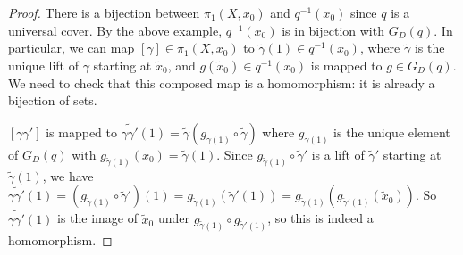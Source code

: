 \begin{proof}
	There is a bijection between \( \pi_1(X, x_0) \) and \( q^{-1}(x_0) \) since \( q \) is a universal cover.
	By the above example, \( q^{-1}(x_0) \) is in bijection with \( G_D(q) \).
	In particular, we can map \( [\gamma] \in \pi_1(X,x_0) \) to \( \widetilde \gamma(1) \in q^{-1}(x_0) \), where \( \widetilde \gamma \) is the unique lift of \( \gamma \) starting at \( \widetilde x_0 \), and \( g(\widetilde x_0) \in q^{-1}(x_0) \) is mapped to \( g \in G_D(q) \).
	We need to check that this composed map is a homomorphism: it is already a bijection of sets.

	\( [\gamma\gamma'] \) is mapped to \( \widetilde{\gamma\gamma'}(1) = \widetilde \gamma (g_{\widetilde \gamma(1)} \circ \widetilde \gamma) \) where \( g_{\widetilde\gamma(1)} \) is the unique element of \( G_D(q) \) with \( g_{\widetilde\gamma(1)}(x_0) = \widetilde \gamma(1) \).
	Since \( g_{\widetilde\gamma(1)} \circ \widetilde\gamma' \) is a lift of \( \widetilde \gamma' \) starting at \( \widetilde \gamma(1) \), we have \( \widetilde{\gamma\gamma'}(1) = (g_{\widetilde\gamma(1)} \circ \widetilde\gamma')(1) = g_{\widetilde\gamma(1)}(\widetilde\gamma'(1)) = g_{\widetilde\gamma(1)}(g_{\widetilde\gamma'(1)}(\widetilde x_0)) \).
	So \( \widetilde{\gamma\gamma'}(1) \) is the image of \( \widetilde x_0 \) under \( g_{\widetilde\gamma(1)} \circ g_{\widetilde\gamma'(1)} \), so this is indeed a homomorphism.
\end{proof}

